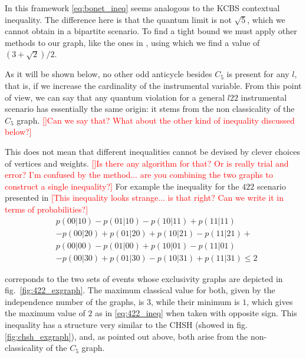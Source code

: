 \documentclass[letterpaper]{article}
\newcommand{\avg}[1]{\langle#1\rangle}
\begin{document}
In this framework \eqref{eq:bonet_ineq} seems analogous to the KCBS contextual
inequality\cite{kcbs2008}.
The difference here is that the quantum limit is not $\sqrt{5}$, which we cannot
obtain in a bipartite scenario.
To find a tight bound we must apply other methods to our graph, like the ones in
\cite{rabelo2014}, using which we find a value of $(3+\sqrt{2})/2$.

As it will be shown below, no other odd anticycle besides
$C_5$ is present for any $l$, that is, if we increase the cardinality of the instrumental variable. From this point of view, we can say that any quantum violation for a general $l22$ instrumental scenario has essentially the
same origin: it stems from the non classicality of the $C_5$ graph. \textcolor{red}{[]Can we say that? What about the other kind of inequality discussed below?]}

This does not mean that different inequalities cannot be devised by clever choices of vertices and weights. \textcolor{red}{[]Is there any algorithm for that? Or is really trial and error? I'm confused by the method... are you combining the two graphs to construct a single inequality?]}
For example the inequality for the $422$ scenario presented in \textcolor{red}{[This inequality looks strange... is that right? Can we write it in terms of probabilities?]}
\begin{align}
&p(00|10)-p(01|10)-p(10|11)+p(11|11)\\
&-p(00|20)+p(01|20)+p(10|21)-p(11|21)+ \nonumber \\
&p(00|00)-p(01|00)+p(10|01)-p(11|01) \nonumber \\
&-p(00|30)+p(01|30)-p(10|31)+p(11|31) \le 2 \nonumber
\end{align}


correponds to the two sets of events whose
exclusivity graphs are depicted in fig.~\ref{fig:422_exgraph}.
The maximum classical value for both, given by the independence number of the
graphs, is $3$, while their minimum is $1$, which gives the maximum value of $2$
as in \eqref{eq:422_ineq} when taken with opposite sign.
This inequality has a structure very similar to the CHSH (showed in
fig.\ref{fig:chsh_exgraph}), and, as pointed out above, both arise from the
non-classicality of the $C_5$ graph.
\end{document}
